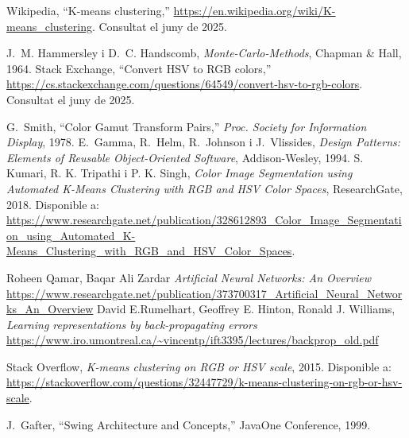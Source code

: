 \documentclass{ieeetj}
\begin{document}

\begin{thebibliography}{1}
Wikipedia, “K-means clustering,” \url{https://en.wikipedia.org/wiki/K-means_clustering}. Consultat el juny de 2025.

 J.~M. Hammersley i D.~C. Handscomb, \emph{Monte-Carlo-Methods}, Chapman \& Hall, 1964.
Stack Exchange, “Convert HSV to RGB colors,” \url{https://cs.stackexchange.com/questions/64549/convert-hsv-to-rgb-colors}. Consultat el juny de 2025.

 G.~Smith, “Color Gamut Transform Pairs,” \emph{Proc. Society for Information Display}, 1978.
 E.~Gamma, R.~Helm, R.~Johnson i J.~Vlissides, \emph{Design Patterns: Elements of Reusable Object-Oriented Software}, Addison-Wesley, 1994.
S. Kumari, R. K. Tripathi i P. K. Singh, \emph{Color Image Segmentation using Automated K-Means Clustering with RGB and HSV Color Spaces}, ResearchGate, 2018. Disponible a: \url{https://www.researchgate.net/publication/328612893_Color_Image_Segmentation_using_Automated_K-Means_Clustering_with_RGB_and_HSV_Color_Spaces}.

 Roheen Qamar, Baqar Ali Zardar \emph{Artificial Neural Networks: An Overview} \url{https://www.researchgate.net/publication/373700317_Artificial_Neural_Networks_An_Overview}
 David E.Rumelhart, Geoffrey E. Hinton, Ronald J. Williams, \emph{Learning representations by back-propagating errors} \url{https://www.iro.umontreal.ca/~vincentp/ift3395/lectures/backprop_old.pdf}

Stack Overflow, \emph{K-means clustering on RGB or HSV scale}, 2015. Disponible a: \url{https://stackoverflow.com/questions/32447729/k-means-clustering-on-rgb-or-hsv-scale}.

 J.~Gafter, “Swing Architecture and Concepts,” JavaOne Conference, 1999.
\end{thebibliography}
\end{document}
